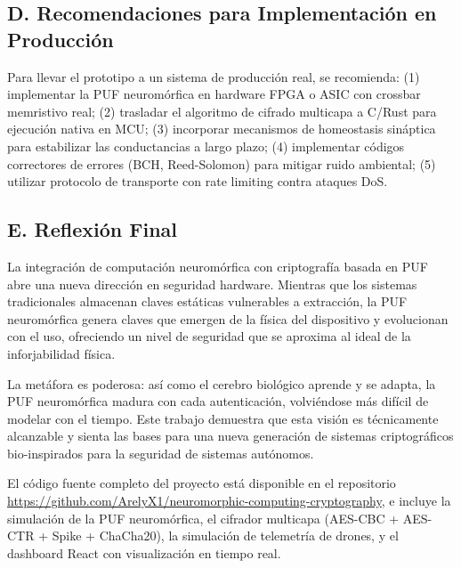 \subsection*{D. Recomendaciones para Implementación en Producción}

Para llevar el prototipo a un sistema de producción real, se recomienda: (1) implementar la PUF neuromórfica en hardware FPGA o ASIC con crossbar memristivo real; (2) trasladar el algoritmo de cifrado multicapa a C/Rust para ejecución nativa en MCU; (3) incorporar mecanismos de homeostasis sináptica para estabilizar las conductancias a largo plazo; (4) implementar códigos correctores de errores (BCH, Reed-Solomon) para mitigar ruido ambiental; (5) utilizar protocolo de transporte con rate limiting contra ataques DoS.

\subsection*{E. Reflexión Final}

La integración de computación neuromórfica con criptografía basada en PUF abre una nueva dirección en seguridad hardware. Mientras que los sistemas tradicionales almacenan claves estáticas vulnerables a extracción, la PUF neuromórfica genera claves que emergen de la física del dispositivo y evolucionan con el uso, ofreciendo un nivel de seguridad que se aproxima al ideal de la inforjabilidad física.

La metáfora es poderosa: así como el cerebro biológico aprende y se adapta, la PUF neuromórfica madura con cada autenticación, volviéndose más difícil de modelar con el tiempo. Este trabajo demuestra que esta visión es técnicamente alcanzable y sienta las bases para una nueva generación de sistemas criptográficos bio-inspirados para la seguridad de sistemas autónomos.

El código fuente completo del proyecto está disponible en el repositorio \url{https://github.com/ArelyX1/neuromorphic-computing-cryptography}, e incluye la simulación de la PUF neuromórfica, el cifrador multicapa (AES-CBC + AES-CTR + Spike + ChaCha20), la simulación de telemetría de drones, y el dashboard React con visualización en tiempo real.
